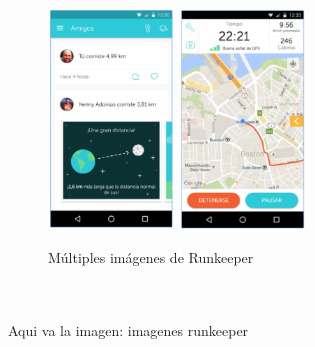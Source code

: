 \documentclass[a4paper, 11pt]{article}
\begin{document}
\begin{figure}[H]
                      \includegraphics[width=0.3\textwidth]{runkeeper5}
                      \includegraphics[width=0.3\textwidth]{runkeeper6}
                        \caption{Múltiples imágenes de Runkeeper}
                        \label{f:runkeeper}
                    \end{figure}
                    \\\\\textcolor[rgb]{1,0,0}{Aqui va la imagen: imagenes runkeeper}\\\\
\end{document}

